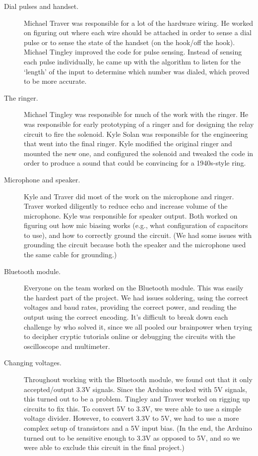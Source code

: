 \documentclass{es50report}
\begin{document}
        \begin{description}
            \item[Dial pulses and handset.]
                Michael Traver was responsible for a lot of the hardware wiring. He worked on figuring out where each wire should be attached in order to sense a dial pulse or to sense the state of the handset (on the hook/off the hook). Michael Tingley improved the code for pulse sensing. Instead of sensing each pulse individually, he came up with the algorithm to listen for the `length' of the input to determine which number was dialed, which proved to be more accurate.
            \item[The ringer.]
                Michael Tingley was responsible for much of the work with the ringer. He was responsible for early prototyping of a ringer and for designing the relay circuit to fire the solenoid. Kyle Solan was responsible for the engineering that went into the final ringer. Kyle modified the original ringer and mounted the new one, and configured the solenoid and tweaked the code in order to produce a sound that could be convincing for a 1940s-style ring.
            \item[Microphone and speaker.]
                Kyle and Traver did most of the work on the microphone and ringer. Traver worked diligently to reduce echo and increase volume of the microphone. Kyle was responsible for speaker output. Both worked on figuring out how mic biasing works (e.g., what configuration of capacitors to use), and how to correctly ground the circuit. (We had some issues with grounding the circuit because both the speaker and the microphone used the same cable for grounding.)
            \item[Bluetooth module.]
                Everyone on the team worked on the Bluetooth module. This was easily the hardest part of the project. We had issues soldering, using the correct voltages and baud rates, providing the correct power, and reading the output using the correct encoding. It's difficult to break down each challenge by who solved it, since we all pooled our brainpower when trying to decipher cryptic tutorials online or debugging the circuits with the oscilloscope and multimeter.
            \item[Changing voltages.]
                Throughout working with the Bluetooth module, we found out that it only accepted/output 3.3V signals. Since the Arduino worked with 5V signals, this turned out to be a problem. Tingley and Traver worked on rigging up circuits to fix this. To convert 5V to 3.3V, we were able to use a simple voltage divider. However, to convert 3.3V to 5V, we had to use a more complex setup of transistors and a 5V input bias. (In the end, the Arduino turned out to be sensitive enough to 3.3V as opposed to 5V, and so we were able to exclude this circuit in the final project.)

\end{description}
\end{document}
